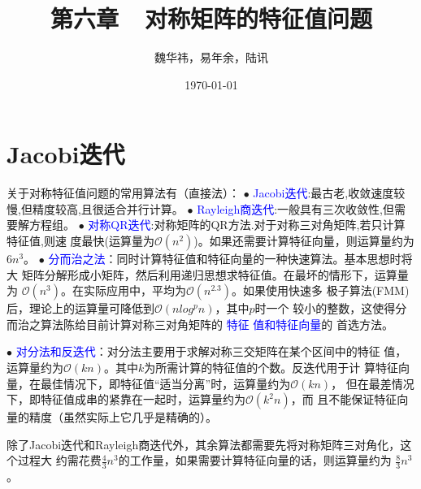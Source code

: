 \documentclass[notheorems,serif]{beamer}
\begin{document}
\title[]{第六章~~对称矩阵的特征值问题}
\author[]{魏华祎，易年余，陆讯}
\date{\today}
\frame[plain]{\titlepage}

\section{Jacobi迭代}
\begin{frame}
关于对称特征值问题的常用算法有（直接法）：
$\bullet$ \textcolor{blue}{Jacobi迭代}:最古老,收敛速度较慢,但精度较高,且很适合并行计算。
$\bullet$ \textcolor{blue}{Rayleigh商迭代}:一般具有三次收敛性,但需要解方程组。
$\bullet$ \textcolor{blue}{对称QR迭代}:对称矩阵的QR方法.对于对称三对角矩阵,若只计算特征值,则速
	度最快(运算量为$\mathcal O(n^2)$)。如果还需要计算特征向量，则运算量约为$6n^3$。
$\bullet$ \textcolor{blue}{分而治之法}：同时计算特征值和特征向量的一种快速算法。基本思想时将大
	矩阵分解形成小矩阵，然后利用递归思想求特征值。在最坏的情形下，运算量为
	$\mathcal O(n^3)$。在实际应用中，平均为$\mathcal O(n^{2.3})$。如果使用快速多
	极子算法(FMM)后，理论上的运算量可降低到$\mathcal O(nlog^p n)$，其中$p$时一个
	较小的整数，这使得分而治之算法陈给目前计算对称三对角矩阵的 \textcolor{blue}{特征
		值和特征向量}的
	首选方法。
\end{frame}
\begin{frame}
$\bullet$ \textcolor{blue}{对分法和反迭代}：对分法主要用于求解对称三交矩阵在某个区间中的特征
	值，运算量约为$\mathcal O(kn)$。其中$k$为所需计算的特征值的个数。反迭代用于计
	算特征向量，在最佳情况下，即特征值“适当分离”时，运算量约为$\mathcal O(kn)$，
	但在最差情况下，即特征值成串的紧靠在一起时，运算量约为$\mathcal O(k^2n)$，而
	且不能保证特征向量的精度（虽然实际上它几乎是精确的）。


\qquad 除了Jacobi迭代和Rayleigh商迭代外，其余算法都需要先将对称矩阵三对角化，这个过程大
约需花费$\frac{4}{3} n^3$的工作量，如果需要计算特征向量的话，则运算量约为
$\frac{8}{3}n^3$。
\end{frame}
\end{document}
